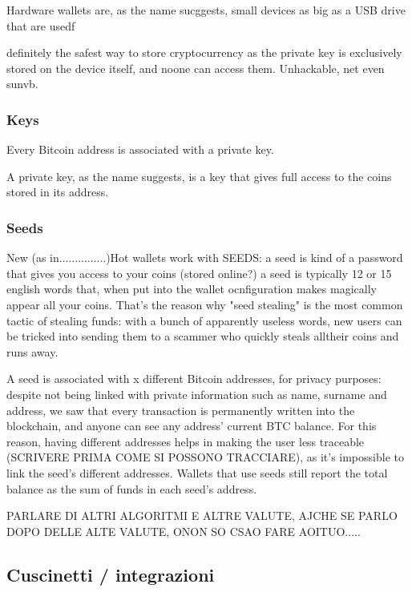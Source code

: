 \documentclass {article}
\begin{document}
Hardware wallets are, as the name sucggests, small devices as big as a USB drive that are usedf

definitely the safest way to store cryptocurrency as the private key is exclusively stored on the device itself, and noone can access them. Unhackable, net even sunvb.



\subsubsection {Keys}



Every Bitcoin address is associated with a private key.

A private key, as the name suggests, is a key that gives full access to the coins stored in its address.



\subsubsection {Seeds}



New (as in...............)Hot wallets work with SEEDS: a seed is kind of a password that gives you access to your coins (stored online?) a seed is typically 12 or 15 english words that, when put into the wallet ocnfiguration makes magically appear all your coins. That's the reason why "seed stealing" is the most common tactic of stealing funds: with a bunch of apparently useless words, new users can be tricked into sending them to a scammer who quickly steals alltheir coins and runs away.

A seed is associated with x different Bitcoin addresses, for privacy purposes: despite not being linked with private information such as name, surname and address, we saw that every transaction is permanently written into the blockchain, and anyone can see any address' current BTC balance. For this reason, having different addresses helps in making the user less traceable (SCRIVERE PRIMA COME SI POSSONO TRACCIARE), as it's impossible to link the seed's different addresses. Wallets that use seeds still report the total balance as the sum of funds in each seed's address.



PARLARE DI ALTRI ALGORITMI E ALTRE VALUTE, AJCHE SE PARLO DOPO DELLE ALTE VALUTE, ONON SO CSAO FARE AOITUO.....



\subsection {Cuscinetti / integrazioni}
\end{document}
